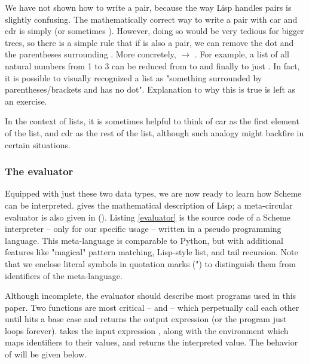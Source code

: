 We have not shown how to write a pair, because the way Lisp handles pairs is slightly confusing. The mathematically correct way to write a pair with car  and cdr  is simply  (or sometimes \code{[a . d]}).
However, doing so would be very tedious for bigger trees, so there is a simple rule that if  is also a pair, we can remove the dot and the parentheses surrounding . More concretely,  $\rightarrow$ .
For example, a list of all natural numbers from 1 to 3 can be reduced from  to  and finally to just . In fact, it is possible to visually recognized a list as "something surrounded by parentheses/brackets and has no dot". Explanation to why this is true is left as an exercise.

In the context of lists, it is sometimes helpful to think of car as the first element of the list, and cdr as the rest of the list, although such analogy might backfire in certain situations.

\subsubsection{The evaluator}
Equipped with just these two data types, we are now ready to learn how Scheme can be interpreted. \textcite{lisp} gives the mathematical description of Lisp; a meta-circular evaluator is also given in (\cite{lisp-man}).
Listing \ref{evaluator} is the source code of a Scheme interpreter -- only for our specific usage -- written in a pseudo programming language. This meta-language is comparable to Python, but with additional features like "magical" pattern matching, Lisp-style list, and tail recursion. Note that we enclose literal symbols in quotation marks (") to distinguish them from identifiers of the meta-language.

Although incomplete, the evaluator should describe most programs used in this paper. Two functions are most critical --  and  -- which perpetually call each other until  hits a base case and returns the output expression (or the program just loops forever).  takes the input expression , along with the environment  which maps identifiers to their values, and returns the interpreted value. The behavior of  will be given below.


